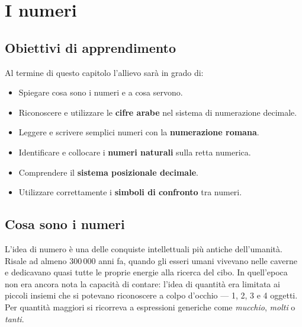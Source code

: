 
\chapter{I numeri}

\section*{Obiettivi di apprendimento}

Al termine di questo capitolo l'allievo sarà in grado di:

\begin{itemize}
  \item Spiegare cosa sono i numeri e a cosa servono.
  \item Riconoscere e utilizzare le \textbf{cifre arabe} nel sistema di numerazione decimale.
  \item Leggere e scrivere semplici numeri con la \textbf{numerazione romana}.
  \item Identificare e collocare i \textbf{numeri naturali} sulla retta numerica.
  \item Comprendere il \textbf{sistema posizionale decimale}.
  \item Utilizzare correttamente i \textbf{simboli di confronto} tra numeri.
\end{itemize}

\bigskip

\section{Cosa sono i numeri}

L'idea di numero è una delle conquiste intellettuali più antiche dell'umanità.
Risale ad almeno 300\,000 anni fa, quando gli esseri umani vivevano nelle caverne
e dedicavano quasi tutte le proprie energie alla ricerca del cibo.
In quell'epoca non era ancora nota la capacità di contare:
l'idea di quantità era limitata ai piccoli insiemi che si potevano riconoscere
a colpo d'occhio — 1, 2, 3 e 4 oggetti.
Per quantità maggiori si ricorreva a espressioni generiche
come \emph{mucchio}, \emph{molti} o \emph{tanti}.

